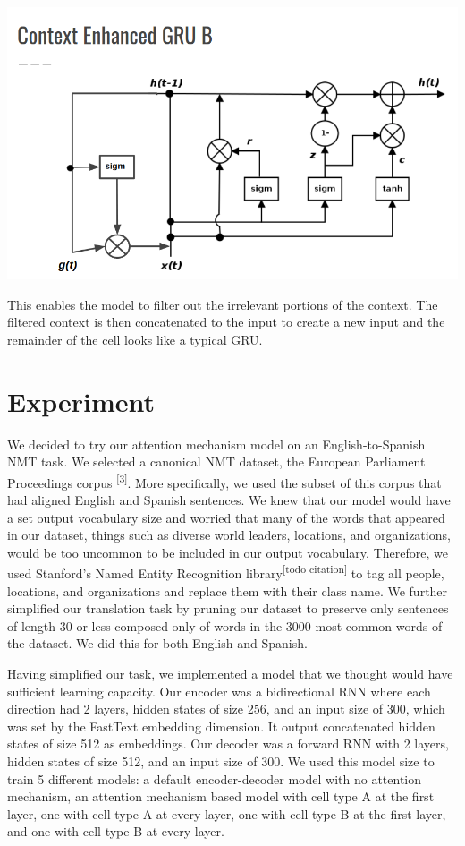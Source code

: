 \documentclass[letterpaper, 11pt]{article}
\begin{document}
\begin{multicols}{2}
\begin{center}
\includegraphics[scale=.2]{context-gru-b}
\end{center}

This enables the model to filter out the irrelevant portions of the context.
The filtered context is then concatenated to the input to create a new input and the remainder of
the cell looks like a typical GRU.

\section{Experiment}

We decided to try our attention mechanism model on an English-to-Spanish NMT task.
We selected a canonical NMT dataset, the European Parliament Proceedings corpus
\textsuperscript{[3]}.
More specifically, we used the subset of this corpus that had aligned English and Spanish sentences.
We knew that our model would have a set output vocabulary size and worried that many of the words
that appeared in our dataset, things such as diverse world leaders, locations, and organizations,
would be too uncommon to be included in our output vocabulary.
Therefore, we used Stanford’s Named Entity Recognition library\textsuperscript{[todo citation]}
to tag all people, locations, and organizations and replace them with their class name.
We further simplified our translation task by pruning our dataset to preserve only sentences of
length 30 or less composed only of words in the 3000 most common words of the dataset.
We did this for both English and Spanish.

Having simplified our task, we implemented a model that we thought would have sufficient learning
capacity.
Our encoder was a bidirectional RNN where each direction had 2 layers, hidden states of size 256,
and an input size of 300, which was set by the FastText embedding dimension.
It output concatenated hidden states of size 512 as embeddings.
Our decoder was a forward RNN with 2 layers, hidden states of size 512, and an input size of 300.
We used this model size to train 5 different models: a default encoder-decoder model with no
attention mechanism, an attention mechanism based model with cell type A at the first
layer, one with cell type A at every layer, one with cell type B at the first
layer, and one with cell type B at every layer.


\end{multicols}
\end{document}
